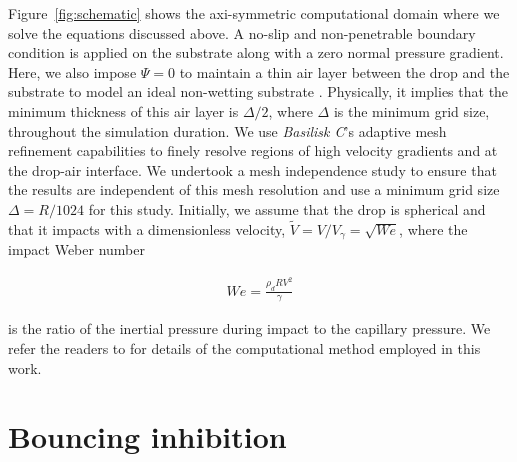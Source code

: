 \documentclass{jfm}
\newcommand{\Wen}{\mathit{We}}
\begin{document}
Figure~\ref{fig:schematic} shows the axi-symmetric computational domain where we solve the equations discussed above. A no-slip and non-penetrable boundary condition is applied on the substrate along with a zero normal pressure gradient. Here, we also impose $\Psi = 0$ to maintain a thin air layer between the drop and the substrate to model an ideal non-wetting substrate \citep[for a detailed discussion about this method, readers are referred to][]{VatsalThesis}. Physically, it implies that the minimum thickness of this air layer is $\Delta/2$, where $\Delta$ is the minimum grid size, throughout the simulation duration. We use \emph{Basilisk C}'s \citep{popinet-basilisk} adaptive mesh refinement capabilities to finely resolve regions of high velocity gradients and at the drop-air interface. We undertook a mesh independence study to ensure that the results are independent of this mesh resolution and use a minimum grid size $\Delta = R/1024$ for this study. Initially, we assume that the drop is spherical and that it impacts with a dimensionless velocity, $\tilde{V} = V/V_\gamma = \sqrt{\Wen}$, where the impact Weber number 

\begin{align}
	\Wen = \frac{\rho_d R V^2}{\gamma}
\end{align}

\noindent is the ratio of the inertial pressure during impact to the capillary pressure. We refer the readers to \cite{popinet2009accurate, popinet-2015-jcp, popinet-basilisk, zhang2022impact, basiliskVatsalViscousBouncing, VatsalThesis} for details of the computational method employed in this work.

\section{Bouncing inhibition}
\label{sec:bouncingInhibition}
\end{document}
